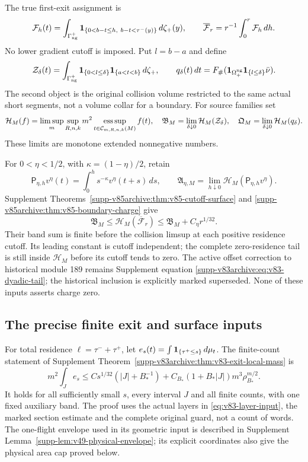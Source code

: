 The true first-exit assignment is
\[
 \mathcal F_h(t)=\int_{\Gamma_{\rm ng}^+}
  \mathbf1_{\{0<b-t\le h,\ b-t<\tau^-(y)\}}\,d\zeta_+(y),\qquad
 \overline{\mathcal F}_r=r^{-1}\int_0^r\mathcal F_h\,dh.
\]
No lower gradient cutoff is imposed. Put $l=b-a$ and define
\[
 \mathcal Z_\delta(t)=\int_{\Gamma_{\rm ng}^+}
       \mathbf1_{\{0<l\le\delta\}}\mathbf1_{\{a<t<b\}}\,d\zeta_+,
 \qquad q_\delta(t)\,dt
  =F_\#(\mathbf1_{\Omega_+^{\rm ng}}\mathbf1_{\{l\le\delta\}}\bar\nu).
\]
The second object is the original collision volume restricted to the
same actual short segments, not a volume collar for a boundary.
For source families set
\[
 \mathcal H_M(f)=\limsup_m\sup_{R,n,k}m^2
            \operatorname*{ess\,sup}_{t\in\mathcal C_{m,R,n,k}(M)}f(t),
 \quad \mathfrak B_M=\lim_{\delta\downarrow0}\mathcal H_M(\mathcal Z_\delta),
 \quad \mathfrak Q_M=\lim_{\delta\downarrow0}\mathcal H_M(q_\delta).
\]
These limits are monotone extended nonnegative numbers.

For $0<\eta<1/2$, with $\kappa=(1-\eta)/2$, retain
\[
 \mathsf P_{\eta,h}v^\eta(t)=\int_0^h s^{-\kappa}v^\eta(t+s)\,ds,
 \qquad\mathfrak A_{\eta,M}
       =\lim_{h\downarrow0}\mathcal H_M(\mathsf P_{\eta,h}v^\eta).
\]
Supplement Theorems~\ref{supp-v85archive:thm:v85-cutoff-surface}
and \ref{supp-v85archive:thm:v85-boundary-charge} give
\begin{equation}\label{eq:v86-surface-input}
 \mathfrak B_M\le\mathcal H_M(\overline{\mathcal F}_r)
                         \le\mathfrak B_M+C_\eta r^{1/32}.
\end{equation}
Their band sum is finite before the collision limsup at each positive
residence cutoff. Its leading constant is cutoff independent; the
complete zero-residence tail is still inside $\mathcal H_M$ before
its cutoff tends to zero. The active offset correction to historical
module 189 remains Supplement equation
\eqref{supp-v83archive:eq:v83-dyadic-tail}; the historical inclusion is
explicitly marked superseded. None of these inputs asserts charge zero.


\subsection{The precise finite exit and surface inputs}
For total residence $\ell=\tau^-+\tau^+$, let
$e_s(t)=\int\mathbf1_{\{\tau^+\le s\}}\,d\mu_t$.
The finite-count statement of Supplement
Theorem~\ref{supp-v83archive:thm:v83-exit-local-mass} is
\begin{equation}\label{eq:v88-exit-input}
 m^2\int_J e_s\le C s^{1/32}(|J|+B_*^{-1})
       +C_{B_*}(1+B_*|J|)m^3\rho_{B_*}^{m/2}.
\end{equation}
It holds for all sufficiently small $s$, every interval $J$ and all
finite counts, with one fixed auxiliary band. The proof uses the
actual layers in \eqref{eq:v83-layer-input}, the marked section
estimate and the complete original guard, not a count of words.
The one-flight envelope used in its geometric input is described in
Supplement Lemma~\ref{supp-lem:v49-physical-envelope}; its explicit
coordinates also give the physical area cap proved below.

